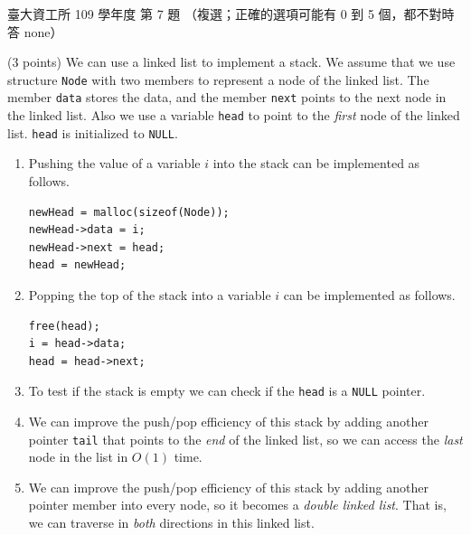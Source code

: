 \begin{pastexam}[label={px:ntu-109-dsaa-07}]{臺大資工所 109 學年度 第 7 題}
（複選；正確的選項可能有 0 到 5 個，都不對時答 none）

(3 points) We can use a linked list to implement a stack. We assume that we use structure
\texttt{Node} with two members to represent a node of the linked list. The member \texttt{data}
stores the data, and the member \texttt{next} points to the next node in the linked list. Also
we use a variable \texttt{head} to point to the \textit{first} node of the linked list.
\texttt{head} is initialized to \texttt{NULL}.
\begin{enumerate}[label=\arabic*.]
\item Pushing the value of a variable $i$ into the stack can be implemented as follows.
\begin{verbatim}
newHead = malloc(sizeof(Node));
newHead->data = i;
newHead->next = head;
head = newHead;
\end{verbatim}
\item Popping the top of the stack into a variable $i$ can be implemented as follows.
\begin{verbatim}
free(head);
i = head->data;
head = head->next;
\end{verbatim}
\item To test if the stack is empty we can check if the \texttt{head} is a \texttt{NULL} pointer.
\item We can improve the push/pop efficiency of this stack by adding another pointer
\texttt{tail} that points to the \textit{end} of the linked list, so we can access the
\textit{last} node in the list in $O(1)$ time.
\item We can improve the push/pop efficiency of this stack by adding another pointer member into
every node, so it becomes a \textit{double linked list}. That is, we can traverse in
\textit{both} directions in this linked list.
\end{enumerate}
\end{pastexam}

